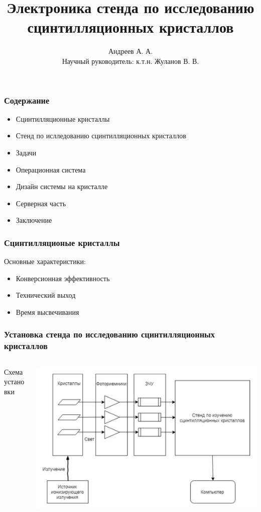 \documentclass[aspectratio=169]{beamer}
\title{Электроника стенда по исследованию сцинтилляционных кристаллов}
\author{Андреев А. А. \\
        Научный руководитель: к.т.н. Жуланов В. В.}
\institute{Новосибирский Государственный Университет}
\begin{document}
\begin{frame}
\titlepage
\end{frame}

\begin{frame}
\frametitle{Содержание}
    \begin{itemize}  
        \item Сцинтилляционные кристаллы
        \item Стенд по ислледованию сцинтилляционных кристаллов
        \item Задачи
        \item Операционная система
        \item Дизайн системы на кристалле
        \item Серверная часть
        \item Заключение
    \end{itemize}
\end{frame}

\begin{frame}
\frametitle{Сцинтилляционые кристаллы}
    Основные характеристики:
    \begin{itemize}  
        \item Конверсионная эффективность
        \item Технический выход
        \item Время высвечивания 
    \end{itemize}
\end{frame}

\begin{frame}
\frametitle{Установка стенда по исследованию сцинтилляционных кристаллов}
    \begin{columns}
        \begin{column}{0.3\textwidth}
            Схема установки
        \end{column}
        \begin{column}{0.7\textwidth}
            \includegraphics[width=\textwidth]{stand.jpg}
        \end{column}
    \end{columns}
\end{frame}
\end{document}
